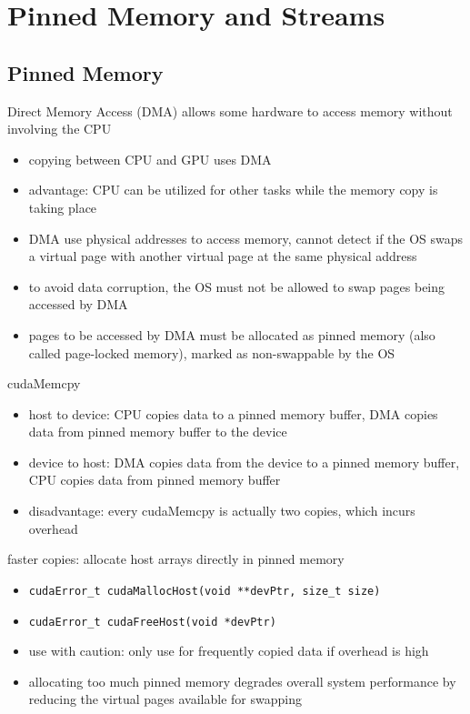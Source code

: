 \documentclass{article}
\begin{document}
\section{Pinned Memory and Streams}

\subsection{Pinned Memory}

Direct Memory Access (DMA) allows some hardware to access memory without involving the CPU

\begin{itemize}
\item copying between CPU and GPU uses DMA
\item advantage: CPU can be utilized for other tasks while the memory copy is taking place
\item DMA use physical addresses to access memory, cannot detect if the OS swaps a virtual page with another virtual page at the same physical address
\item to avoid data corruption, the OS must not be allowed to swap pages being accessed by DMA
\item pages to be accessed by DMA must be allocated as pinned memory (also called page-locked memory), marked as non-swappable by the OS

\end{itemize}
cudaMemcpy

\begin{itemize}
\item host to device: CPU copies data to a pinned memory buffer, DMA copies data from pinned memory buffer to the device
\item device to host: DMA copies data from the device to a pinned memory buffer, CPU copies data from pinned memory buffer
\item disadvantage: every cudaMemcpy is actually two copies, which incurs overhead

\end{itemize}
faster copies: allocate host arrays directly in pinned memory

\begin{itemize}
\item \texttt{cudaError\_t cudaMallocHost(void **devPtr, size\_t size)}
\item \texttt{cudaError\_t cudaFreeHost(void *devPtr)}
\item use with caution: only use for frequently copied data if overhead is high
\item allocating too much pinned memory degrades overall system performance by reducing the virtual pages available for swapping

\end{itemize}
\end{document}
